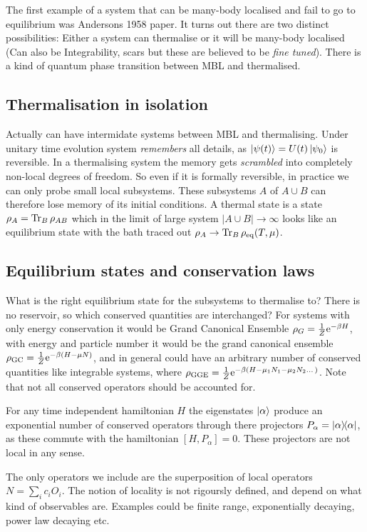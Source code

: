 \documentclass[a4paper]{article}
\begin{document}
The first example of a system that can be many-body localised and fail to go to
equilibrium was Andersons 1958 paper. 
It turns out there are two distinct possibilities: Either a system can
thermalise or it will be many-body localised (Can also be Integrability, scars
but these are believed to be \emph{fine tuned}). There is
a kind of quantum phase transition between MBL and thermalised.

\subsection{Thermalisation in isolation}
Actually can have intermidate systems between MBL and thermalising. 
Under unitary time evolution system \emph{remembers} all details, as
$\ket{\psi(t)}=U(t)\ket{\psi_0}$ is reversible. In a thermalising system the
memory gets \emph{scrambled} into completely non-local degrees of freedom. So
even if it is formally reversible, in practice we can only probe small local
subsystems. These subsystems $A$ of $A\cup B$ can therefore lose memory of its
initial conditions. A thermal state is a state $\rho_A=\operatorname{Tr}_B \rho_{AB}$ which in
the limit of large system $|A\cup B|\to \infty$ looks like an equilibrium state
with the bath traced out $\rho_A\to \operatorname{Tr}_B
\rho_\mathrm{eq} (T,\mu)$.
\subsection{Equilibrium states and conservation laws}
What is the right equilibrium state for the subsystems to thermalise to? There
is no reservoir, so which conserved quantities are interchanged? For systems
with only energy conservation it would be Grand Canonical Ensemble
$\rho_G=\frac{1}{Z} \mathrm{e}^{-\beta H}$, with energy and particle number it would be
the grand canonical ensemble $\rho_\mathrm{GC}=\frac{1}{Z}\mathrm{e}^{-\beta(H-\mu N)}$,
and in general could have an arbitrary number of conserved quantities like
integrable systems, where $\rho_\mathrm{GGE}=\frac{1}{Z}\mathrm{e}^{-\beta(H-\mu_1
N_1-\mu_2 N_2\dots)}$. Note that not all conserved operators should be accounted
for. 
\begin{example}
    For any time independent hamiltonian $H$ the eigenstates $\ket{\alpha}$
    produce an exponential number of conserved operators through there
    projectors $P_\alpha=\ket{\alpha}\!\!\bra{\alpha}$, as these commute with the
    hamiltonian $[H,P_\alpha]=0$. These projectors are not local in any sense.
\end{example}
The only operators we include are the superposition of local operators $N=\sum_i
c_i O_i$. The notion of locality is not rigoursly defined, and depend on what
kind of observables are. Examples could be finite range, exponentially decaying,
power law decaying etc.
\end{document}
